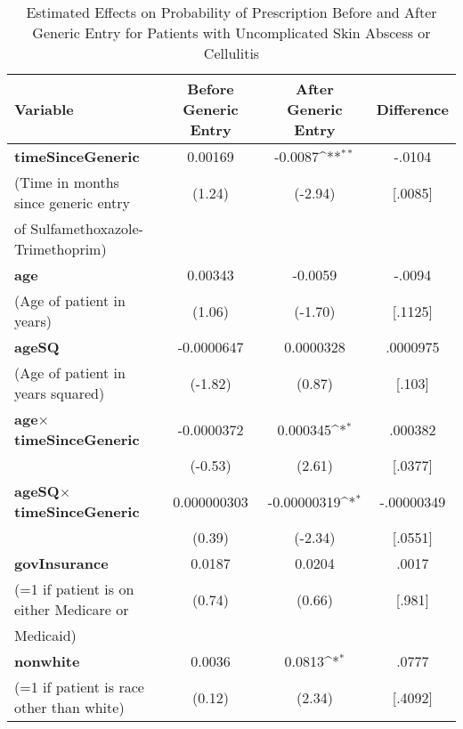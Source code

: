 \begin{table}[htbp]\centering
\def\sym#1{\ifmmode^{#1}\else\(^{#1}\)\fi}
\caption{Estimated Effects on Probability of Prescription Before and After Generic Entry for Patients with Uncomplicated Skin Abscess or Cellulitis\label{tab1}}
\begin{tabular}{l*{3}{c}}
\hline\hline
Variable            &\multicolumn{1}{c}{Before Generic Entry}&\multicolumn{1}{c}{After Generic Entry}&\multicolumn{1}{c}{Difference}\\
\hline
\textbf{timeSinceGeneric}&                            0.00169         &     -0.0087\sym{**} & -.0104\\
(Time in months since generic entry            &      (1.24)         &     (-2.94) & [.0085]\\
of Sulfamethoxazole-Trimethoprim)\\
[1em]
\textbf{age}         &                      0.00343         &    -0.0059 & -.0094\\
(Age of patient in years)            &      (1.06)         &     (-1.70) & [.1125]\\
[1em]
\textbf{ageSQ}       &                             -0.0000647         &   0.0000328 & .0000975\\
(Age of patient in years squared)            &     (-1.82)         &      (0.87) & [.103]\\
[1em]
\textbf{age}$\times$\textbf{timeSinceGeneric}      &  -0.0000372         &    0.000345\sym{*}& .000382 \\
            &                                          (-0.53)         &      (2.61)         & [.0377]\\
[1em]
\textbf{ageSQ}$\times$\textbf{timeSinceGeneric}    & 0.000000303         & -0.00000319\sym{*}  & -.00000349\\
            &                                        (0.39)         &     (-2.34)         & [.0551]\\
[1em]
\textbf{govInsurance}&                                    0.0187         &      0.0204         & .0017\\
(=1 if patient is on either Medicare or            &      (0.74)         &      (0.66)         & [.981]\\
Medicaid)\\
[1em]
\textbf{nonwhite}    &                                     0.0036         &      0.0813\sym{*}  & .0777\\
(=1 if patient is race other than white)            &      (0.12)         &      (2.34)         & [.4092]\\

\end{tabular}
\end{table}
